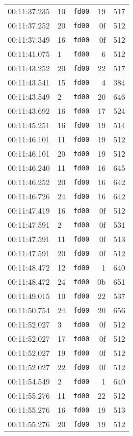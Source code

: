 \documentclass{article}
\begin{document}
\begin{longtable}{lllrr}
00:11:37.235 & 10 & \texttt{fd00} & 19 & 517 \\
00:11:37.252 & 20 & \texttt{fd00} & 0f & 512 \\
00:11:37.349 & 16 & \texttt{fd00} & 0f & 512 \\
00:11:41.075 & 1 & \texttt{fd00} & 6 & 512 \\
00:11:43.252 & 20 & \texttt{fd00} & 22 & 517 \\
00:11:43.541 & 15 & \texttt{fd00} & 4 & 384 \\
00:11:43.549 & 2 & \texttt{fd00} & 20 & 646 \\
00:11:43.692 & 16 & \texttt{fd00} & 17 & 524 \\
00:11:45.251 & 16 & \texttt{fd00} & 19 & 514 \\
00:11:46.101 & 11 & \texttt{fd00} & 19 & 512 \\
00:11:46.101 & 20 & \texttt{fd00} & 19 & 512 \\
00:11:46.240 & 11 & \texttt{fd00} & 16 & 645 \\
00:11:46.252 & 20 & \texttt{fd00} & 16 & 642 \\
00:11:46.726 & 24 & \texttt{fd00} & 16 & 642 \\
00:11:47.419 & 16 & \texttt{fd00} & 0f & 512 \\
00:11:47.591 & 2 & \texttt{fd00} & 0f & 531 \\
00:11:47.591 & 11 & \texttt{fd00} & 0f & 513 \\
00:11:47.591 & 20 & \texttt{fd00} & 0f & 512 \\
00:11:48.472 & 12 & \texttt{fd00} & 1 & 640 \\
00:11:48.472 & 24 & \texttt{fd00} & 0b & 651 \\
00:11:49.015 & 10 & \texttt{fd00} & 22 & 537 \\
00:11:50.754 & 24 & \texttt{fd00} & 20 & 656 \\
00:11:52.027 & 3 & \texttt{fd00} & 0f & 512 \\
00:11:52.027 & 17 & \texttt{fd00} & 0f & 512 \\
00:11:52.027 & 19 & \texttt{fd00} & 0f & 512 \\
00:11:52.027 & 22 & \texttt{fd00} & 0f & 512 \\
00:11:54.549 & 2 & \texttt{fd00} & 1 & 640 \\
00:11:55.276 & 11 & \texttt{fd00} & 22 & 512 \\
00:11:55.276 & 16 & \texttt{fd00} & 19 & 513 \\
00:11:55.276 & 20 & \texttt{fd00} & 19 & 512 \\

\end{longtable}
\end{document}
